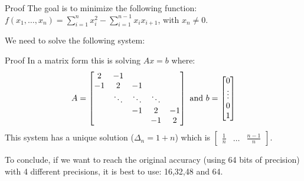 \documentclass{beamer}
\begin{document}
\begin{frame}{Proof}
  The goal is to minimize the following function: $f(x_1,\dots,x_n) = \sum\limits_{i=1}^n x_i^2 - \sum\limits_{i=1}^{n-1} x_ix_{i+1}$\pause, with $x_n \neq 0$.\pause
  
\vspace{0.7cm}
We need to solve the following system:
\end{frame}

\begin{frame}{Proof}
 In a matrix form this is solving $Ax=b$ where:\[ A = \begin{bmatrix}
    2       & -1 &  &  &  \\
    -1       & 2 & -1 &  &  \\
    & \ddots & \ddots & \ddots & \\
    & & -1 & 2 & -1 \\
           &  &  & -1 & 2
\end{bmatrix} \textup{ and } b = \begin{bmatrix} 0 \\ \vdots \\ 0 \\ 1 \end{bmatrix} \]
\pause
This system has a unique solution ($\Delta_n = 1+n$) which is $\begin{bmatrix} \frac{1}{n} & \dots & \frac{n-1}{n} \end{bmatrix}$.

\vspace{0.5cm}
To conclude, if we want to reach the original accuracy (using 64 bits of precision) with 4 different precisions, it is best to use: 16,32,48 and 64.
\end{frame}
\end{document}
